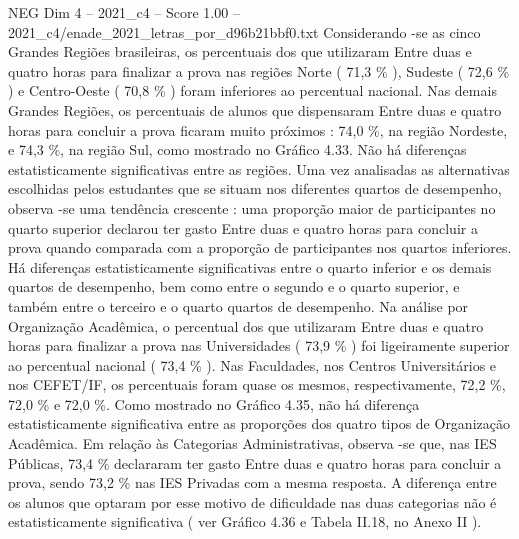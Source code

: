 \begin{textsample}{NEG Dim 4 – 2021\_c4 – Score 1.00 – 2021\_c4/enade\_2021\_letras\_por\_d96b21bbf0.txt}
Considerando -se as cinco Grandes Regiões brasileiras, os percentuais dos que utilizaram Entre duas e quatro horas para finalizar a prova nas regiões Norte ( 71,3 \% ), Sudeste ( 72,6 \% ) e Centro-Oeste ( 70,8 \% ) foram inferiores ao percentual nacional.
Nas demais Grandes Regiões, os percentuais de alunos que dispensaram Entre duas e quatro horas para concluir a prova ficaram muito próximos : 74,0 \%, na região Nordeste, e 74,3 \%, na região Sul, como mostrado no Gráfico 4.33.
Não há diferenças estatisticamente significativas entre as regiões.
Uma vez analisadas as alternativas escolhidas pelos estudantes que se situam nos diferentes quartos de desempenho, observa -se uma tendência crescente : uma proporção maior de participantes no quarto superior declarou ter gasto Entre duas e quatro horas para concluir a prova quando comparada com a proporção de participantes nos quartos inferiores.
Há diferenças estatisticamente significativas entre o quarto inferior e os demais quartos de desempenho, bem como entre o segundo e o quarto superior, e também entre o terceiro e o quarto quartos de desempenho.
Na análise por Organização Acadêmica, o percentual dos que utilizaram Entre duas e quatro horas para finalizar a prova nas Universidades ( 73,9 \% ) foi ligeiramente superior ao percentual nacional ( 73,4 \% ).
Nas Faculdades, nos Centros Universitários e nos CEFET/IF, os percentuais foram quase os mesmos, respectivamente, 72,2 \%, 72,0 \% e 72,0 \%.
Como mostrado no Gráfico 4.35, não há diferença estatisticamente significativa entre as proporções dos quatro tipos de Organização Acadêmica.
Em relação às Categorias Administrativas, observa -se que, nas IES Públicas, 73,4 \% declararam ter gasto Entre duas e quatro horas para concluir a prova, sendo 73,2 \% nas IES Privadas com a mesma resposta.
A diferença entre os alunos que optaram por esse motivo de dificuldade nas duas categorias não é estatisticamente significativa ( ver Gráfico 4.36 e Tabela II.18, no Anexo II ).

\end{textsample}
